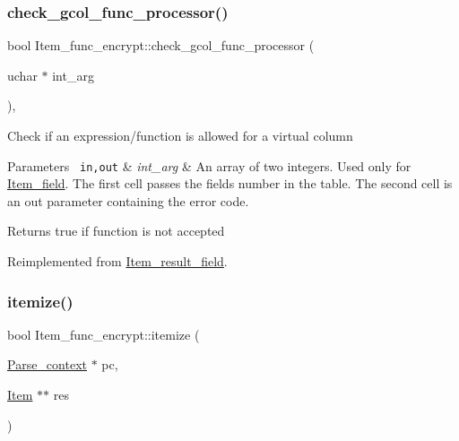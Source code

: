 \subsubsection{\texorpdfstring{check\+\_\+gcol\+\_\+func\+\_\+processor()}{check\_gcol\_func\_processor()}}
{\footnotesize\ttfamily bool Item\+\_\+func\+\_\+encrypt\+::check\+\_\+gcol\+\_\+func\+\_\+processor (\begin{DoxyParamCaption}\item[{uchar $\ast$}]{int\+\_\+arg }\end{DoxyParamCaption})\hspace{0.3cm}{\ttfamily [inline]}, {\ttfamily [virtual]}}

Check if an expression/function is allowed for a virtual column


\begin{DoxyParams}[1]{Parameters}
\mbox{\texttt{ in,out}}  & {\em int\+\_\+arg} & An array of two integers. Used only for \mbox{\hyperlink{classItem__field}{Item\+\_\+field}}. The first cell passes the field\textquotesingle{}s number in the table. The second cell is an out parameter containing the error code.\\
\hline
\end{DoxyParams}
\begin{DoxyReturn}{Returns}
true if function is not accepted 
\end{DoxyReturn}


Reimplemented from \mbox{\hyperlink{classItem__result__field_a12324702e7f419b47de45e3505730441}{Item\+\_\+result\+\_\+field}}.

\mbox{\label{classItem__func__encrypt_acea55a9904c3859cf69425dddf16a121}} 
\subsubsection{\texorpdfstring{itemize()}{itemize()}}
{\footnotesize\ttfamily bool Item\+\_\+func\+\_\+encrypt\+::itemize (\begin{DoxyParamCaption}\item[{\mbox{\hyperlink{structParse__context}{Parse\+\_\+context}} $\ast$}]{pc,  }\item[{\mbox{\hyperlink{classItem}{Item}} $\ast$$\ast$}]{res }\end{DoxyParamCaption})\hspace{0.3cm}{\ttfamily [virtual]}}


